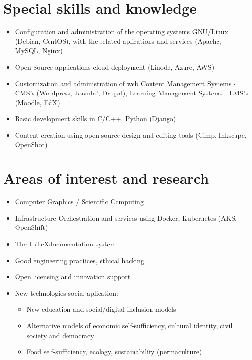 \documentclass[overlapped,line,final]{res}
\begin{document}
\begin{resume}
\vspace{0.25cm}

\section{\sc Special skills and knowledge}
\vspace{0.5cm}
\begin{itemize}
	\item Configuration and administration of the operating systems GNU/Linux (Debian, CentOS), with the related aplications and services (Apache, MySQL, Nginx)
	\item Open Source applications cloud deployment (Linode, Azure, AWS) 
	\item Customization and administration of web Content Management Systems - CMS's (Wordpress, Joomla!, Drupal), Learning Management Systems - LMS's (Moodle, EdX)
	\item Basic development skills in C/C++, Python (Django)
 	\item Content creation using open source design and editing tools (Gimp, Inkscape, OpenShot)
\end{itemize}

\section{\sc Areas of interest and research}
\vspace{0.5cm}
\begin{itemize}
	\item Computer Graphics / Scientific Computing
	\item Infrastructure Orchestration and services using Docker, Kubernetes (AKS, OpenShift)
	\item The \LaTeX documentation system	
    \item Good engineering practices, ethical hacking
	\item Open licensing and innovation support
    \item New technologies social aplication:
    \begin{itemize}
		\item New education and social/digital inclusion models
	    \item Alternative models of economic self-sufficiency, cultural identity, civil society and democracy
	    \item Food self-sufficiency, ecology, sustainability (permaculture)
    \end{itemize}


\end{itemize}
\end{resume}
\end{document}

